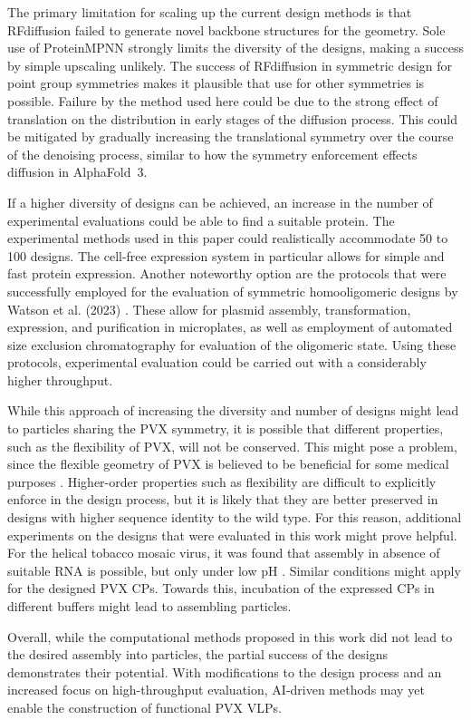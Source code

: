 The primary limitation for scaling up the current design methods is that RFdiffusion failed to generate novel backbone structures for the geometry. Sole use of ProteinMPNN strongly limits the diversity of the designs, making a success by simple upscaling unlikely. The success of RFdiffusion in symmetric design for point group symmetries makes it plausible that use for other symmetries is possible. Failure by the method used here could be due to the strong effect of translation on the distribution in early stages of the diffusion process. This could be mitigated by gradually increasing the translational symmetry over the course of the denoising process, similar to how the symmetry enforcement effects diffusion in AlphaFold~3.

If a higher diversity of designs can be achieved, an increase in the number of experimental evaluations could be able to find a suitable protein. The experimental methods used in this paper could realistically accommodate 50 to 100 designs. The cell-free expression system in particular allows for simple and fast protein expression. Another noteworthy option are the protocols that were successfully employed for the evaluation of symmetric homooligomeric designs by Watson et al. (2023) \cite{RFdiffusion}. These allow for plasmid assembly, transformation, expression, and purification in microplates, as well as employment of automated size exclusion chromatography for evaluation of the oligomeric state. Using these protocols, experimental evaluation could be carried out with a considerably higher throughput. 

While this approach of increasing the diversity and number of designs might lead to particles sharing the PVX symmetry, it is possible that different properties, such as the flexibility of PVX, will not be conserved. This might pose a problem, since the flexible geometry of PVX is believed to be beneficial for some medical purposes \cite{plant_virus_bone}. Higher-order properties such as flexibility are difficult to explicitly enforce in the design process, but it is likely that they are better preserved in designs with higher sequence identity to the wild type. For this reason, additional experiments on the designs that were evaluated in this work might prove helpful. For the helical tobacco mosaic virus, it was found that assembly in absence of suitable RNA is possible, but only under low pH \cite{tmv_assembly_low_ph}. Similar conditions might apply for the designed PVX CPs. Towards this, incubation of the expressed CPs in different buffers might lead to assembling particles. 

Overall, while the computational methods proposed in this work did not lead to the desired assembly into particles, the partial success of the designs demonstrates their potential. With modifications to the design process and an increased focus on high-throughput evaluation, AI-driven methods may yet enable the construction of functional PVX VLPs.